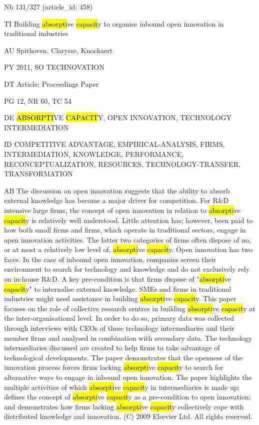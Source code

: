 \documentclass[a4paper]{article}
\begin{document}
\vspace*{-2cm}
Nb \tabto{0cm}131/327 (article\_id: 458)\par
TI \tabto{0cm}Building \hl{absorpti}ve \hl{capacit}y to organise inbound open innovation in traditional industries\par
AU \tabto{0cm}Spithoven, Clarysse, Knockaert\par
PY \tabto{0cm}2011, SO TECHNOVATION\par
DT \tabto{0cm}Article; Proceedings Paper\par
PG \tabto{0cm}12, NR 60, TC 54\par
DE \tabto{0cm}\hl{ABSORPTI}VE \hl{CAPACIT}Y, OPEN INNOVATION, TECHNOLOGY INTERMEDIATION\par
ID \tabto{0cm}COMPETITIVE ADVANTAGE, EMPIRICAL-ANALYSIS, FIRMS, INTERMEDIATION, KNOWLEDGE, PERFORMANCE, RECONCEPTUALIZATION, RESOURCES, TECHNOLOGY-TRANSFER, TRANSFORMATION\par
AB \tabto{0cm}The discussion on open innovation suggests that the ability to absorb external knowledge has become a major driver for competition. For R\&D intensive large firms, the concept of open innovation in relation to \hl{absorpti}ve \hl{capacit}y is relatively well understood. Little attention has; however, been paid to how both small firms and firms, which operate in traditional sectors, engage in open innovation activities. The latter two categories of firms often dispose of no, or at most a relatively low level of, \hl{absorpti}ve \hl{capacit}y. Open innovation has two faces. In the case of inbound open innovation, companies screen their environment to search for technology and knowledge and do not exclusively rely on in-house R\&D. A key pre-condition is that firms dispose of "\hl{absorpti}ve \hl{capacit}y" to internalise external knowledge. SMEs and firms in traditional industries might need assistance in building \hl{absorpti}ve \hl{capacit}y. This paper focuses on the role of collective research centres in building \hl{absorpti}ve \hl{capacit}y at the inter-organisational level. In order to do so, primary data was collected through interviews with CEOs of these technology intermediaries and their member firms and analysed in combination with secondary data. The technology intermediaries discussed are created to help firms to take advantage of technological developments. The paper demonstrates that the openness of the innovation process forces firms lacking \hl{absorpti}ve \hl{capacit}y to search for alternative ways to engage in inbound open innovation. The paper highlights the multiple activities of which \hl{absorpti}ve \hl{capacit}y in intermediaries is made up; defines the concept of \hl{absorpti}ve \hl{capacit}y as a pre-condition to open innovation; and demonstrates how firms lacking \hl{absorpti}ve \hl{capacit}y collectively cope with distributed knowledge and innovation. (C) 2009 Elsevier Ltd. All rights reserved.\par
\clearpage
\end{document}
